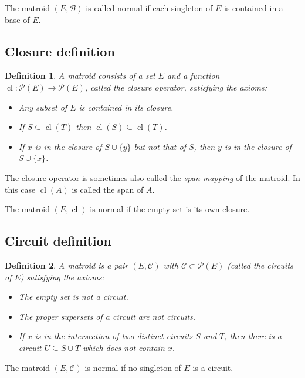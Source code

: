 \documentclass[12pt]{article}
\newtheorem{definition}{Definition}
\DeclareMathOperator{\cl}{cl}
\begin{document}
The matroid $(E,\mathcal{B})$ is called normal if each singleton of $E$ is contained in a base of $E$.

\subsection*{Closure definition}

\begin{definition}
A matroid consists of a set $E$ and a function $\cl\colon\mathcal{P}(E)\to\mathcal{P}(E)$, called the {\em closure operator}, satisfying the axioms:

\begin{itemize}
\item[cl1] Any subset of $E$ is contained in its closure.
\item[cl2] If $S\subseteq\cl(T)$ then $\cl(S)\subseteq\cl(T)$.
\item[cl3] If $x$ is in the closure of $S\cup\{y\}$ but not that of $S$, then $y$ is in the closure of $S\cup\{x\}$.
\end{itemize}
\end{definition}

The closure operator is sometimes also called the {\em span mapping} of the matroid.  In this case $\cl(A)$ is called the span of $A$.

The matroid $(E,\cl)$ is normal if the empty set is its own closure.

\subsection*{Circuit definition}

\begin{definition}
A matroid is a pair $(E,\mathcal{C})$ with $\mathcal{C}\subset\mathcal{P}(E)$ (called the {\em circuits} of $E$) satisfying the axioms:

\begin{itemize}
\item[c1] The empty set is not a circuit.
\item[c2] The proper supersets of a circuit are not circuits.
\item[c3] If $x$ is in the intersection of two distinct circuits $S$ and $T$, then there is a circuit $U\subseteq S\cup T$ which does not contain $x$.
\end{itemize}
\end{definition}

The matroid $(E,\mathcal{C})$ is normal if no singleton of $E$ is a circuit.
\end{document}
